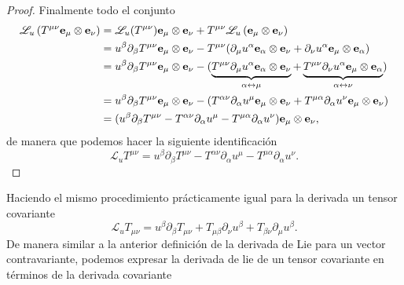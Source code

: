 \begin{proof}
Finalmente todo el conjunto
\begin{equation}
    \begin{aligned}
        \mathscr{L}_u \left( T^{\mu \nu} \mathbf{e_\mu} \otimes \mathbf{e_\nu} \right) & = \mathscr{L}_u(T^{\mu \nu}) \mathbf{e_\mu} \otimes \mathbf{e_\nu} + T^{\mu \nu} \mathscr{L}_u \left( \mathbf{e_\mu} \otimes \mathbf{e_\nu} \right)                                                                                                                                                                \\
                                                                                 & = u^\beta \partial_\beta T^{\mu \nu}  \mathbf{e_\mu} \otimes \mathbf{e_\nu}  - T^{\mu \nu}( \partial_\mu u^\alpha \mathbf{e_\alpha} \otimes  \mathbf{e_\nu} +\partial_\nu u^\alpha \mathbf{e_\mu}\otimes\mathbf{e_\alpha} )                                                                                                      \\
                                                                                 & = u^\beta \partial_\beta T^{\mu \nu}  \mathbf{e_\mu} \otimes \mathbf{e_\nu}  - ( \underbrace{T^{\mu \nu} \partial_\mu u^\alpha \mathbf{e_\alpha} \otimes  \mathbf{e_\nu} }_{\alpha \leftrightarrow \mu}+\underbrace{T^{\mu \nu} \partial_\nu u^\alpha \mathbf{e_\mu}\otimes\mathbf{e_\alpha} }_{\alpha \leftrightarrow \nu}) \\
                                                                                 & = u^\beta \partial_\beta T^{\mu \nu}  \mathbf{e_\mu} \otimes \mathbf{e_\nu}  - ( T^{\alpha \nu} \partial_\alpha u^\mu \mathbf{e_\mu} \otimes  \mathbf{e_\nu} +T^{\mu \alpha} \partial_\alpha u^\nu \mathbf{e_\mu}\otimes\mathbf{e_\nu} )                                                                                     \\
                                                                                 & = (u^\beta \partial_\beta T^{\mu \nu}   -  T^{\alpha \nu} \partial_\alpha u^\mu  -T^{\mu \alpha} \partial_\alpha u^\nu  )\mathbf{e_\mu}\otimes\mathbf{e_\nu},
    \end{aligned}
\end{equation}
de manera que  podemos hacer la siguiente identificación
\begin{equation}
  \mathscr{L}_u T^{\mu \nu} = u^\beta \partial_\beta T^{\mu \nu}   -  T^{\alpha \nu} \partial_\alpha u^\mu  -T^{\mu \alpha} \partial_\alpha u^\nu.
\end{equation}
\end{proof}

\noindent Haciendo el mismo procedimiento prácticamente igual  para la derivada un tensor covariante 
\begin{equation}
    \mathscr{L}_u T_{\mu \nu} = u^\beta \partial_\beta T_{\mu \nu}   +  T_{\mu \beta } \partial_\nu u^\beta  + T_{ \beta \nu} \partial_\mu u^\beta.
\end{equation}
De manera similar a la anterior definición de la derivada de Lie para un vector contravariante, podemos expresar la derivada de lie de un tensor covariante en términos de la derivada covariante 

